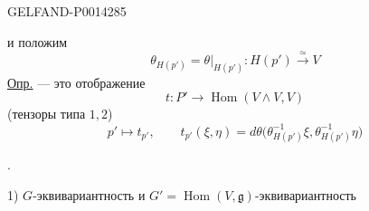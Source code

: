 \begin{GelfandAdjacentEvidence}{GELFAND-P001428}{5}


и положим
\[
\theta_{H(p')}=\theta|_{H(p')}\colon H(p')\overset{\simeq}{\longrightarrow}V
\]
\uline{Опр.}\quad {} — это отображение
\[
t\colon P'\longrightarrow\operatorname{Hom}(V\wedge V,V)
\]
(тензоры типа \(1,2\))
\[
p'\mapsto t_{p'},\qquad
t_{p'}(\xi,\eta)=d\theta\bigl(\theta_{H(p')}^{-1}\xi,\theta_{H(p')}^{-1}\eta\bigr)
\]
\end{GelfandAdjacentEvidence}


.

1) \(G\)-эквивариантность и \(G'=\operatorname{Hom}(V,\mathfrak g)\)-эквивариантность


